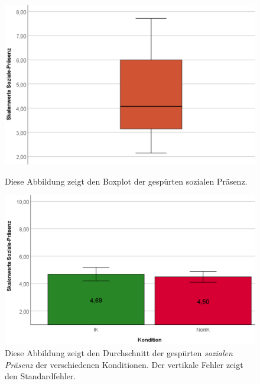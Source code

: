 \documentclass[a4paper,11pt]{article}%
\renewcommand{\\}{\vspace*{0.5\baselineskip} \newline}
\begin{document}
		\begin{figure}[H]
   \begin{minipage}[t]{.5\linewidth} %
      \includegraphics[width=\linewidth]{Abbildungen/AuswertungDiagramme/BP_SocialPresence.png}
      \caption[Boxplot der gespürten sozialen Präsenz]{Diese Abbildung zeigt den Boxplot der gespürten sozialen Präsenz.}
            \label{BP_SocialPresence}
   \end{minipage}
   \hspace{.02\linewidth}%
   \begin{minipage}[t]{.5\linewidth} %
     \includegraphics[width=\linewidth]{Abbildungen/AuswertungDiagramme/SD_SocialPresence_Mittelwerte.png}
      \caption[Durchschnittlich gespürte \textit{sozialen Präsenz}]{Diese Abbildung zeigt den Durchschnitt der gespürten \textit{sozialen Präsenz} der verschiedenen Konditionen. Der vertikale Fehler zeigt den Standardfehler.}
       \label{SD_SocialPresence_Mittelwerte}
   \end{minipage}
\end{figure}
\end{document}
